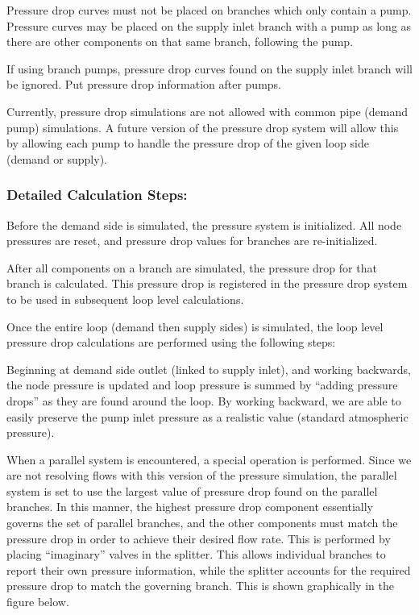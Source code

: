 Pressure drop curves must not be placed on branches which only contain a pump. Pressure curves may be placed on the supply inlet branch with a pump as long as there are other components on that same branch, following the pump.

If using branch pumps, pressure drop curves found on the supply inlet branch will be ignored. Put pressure drop information after pumps.

Currently, pressure drop simulations are not allowed with common pipe (demand pump) simulations. A future version of the pressure drop system will allow this by allowing each pump to handle the pressure drop of the given loop side (demand or supply).

\subsubsection{Detailed Calculation Steps:}\label{detailed-calculation-steps}

Before the demand side is simulated, the pressure system is initialized. All node pressures are reset, and pressure drop values for branches are re-initialized.

After all components on a branch are simulated, the pressure drop for that branch is calculated. This pressure drop is registered in the pressure drop system to be used in subsequent loop level calculations.

Once the entire loop (demand then supply sides) is simulated, the loop level pressure drop calculations are performed using the following steps:

Beginning at demand side outlet (linked to supply inlet), and working backwards, the node pressure is updated and loop pressure is summed by ``adding pressure drops'' as they are found around the loop. By working backward, we are able to easily preserve the pump inlet pressure as a realistic value (standard atmospheric pressure).

When a parallel system is encountered, a special operation is performed. Since we are not resolving flows with this version of the pressure simulation, the parallel system is set to use the largest value of pressure drop found on the parallel branches. In this manner, the highest pressure drop component essentially governs the set of parallel branches, and the other components must match the pressure drop in order to achieve their desired flow rate. This is performed by placing ``imaginary'' valves in the splitter. This allows individual branches to report their own pressure information, while the splitter accounts for the required pressure drop to match the governing branch. This is shown graphically in the figure below.

